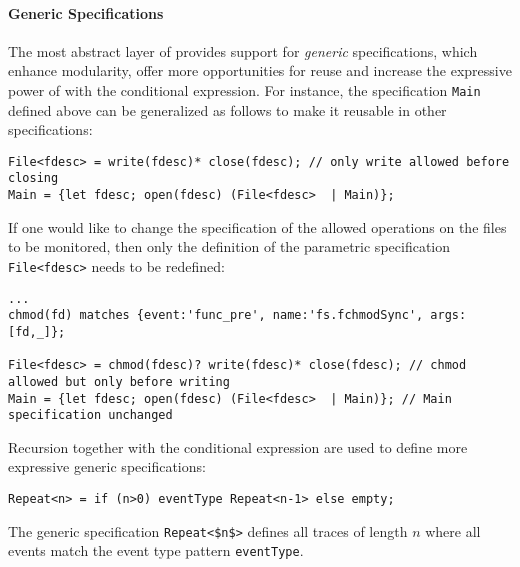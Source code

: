 \paragraph{Generic Specifications}
The most abstract layer of \rml provides support for \emph{generic} specifications,
which enhance modularity, offer more opportunities for reuse and increase the expressive power of \rml with the conditional expression.
For instance, the specification \lstinline{Main} defined above
can be generalized as follows to make it reusable in other specifications:
\begin{lstlisting}[basicstyle=\ttfamily\footnotesize]
File<fdesc> = write(fdesc)* close(fdesc); // only write allowed before closing 
Main = {let fdesc; open(fdesc) (File<fdesc>  | Main)};
\end{lstlisting}
If one would like to change the specification of the allowed operations on the files to be monitored, then only the definition
of the parametric specification \lstinline{File<fdesc>} needs to be redefined:
\begin{lstlisting}[basicstyle=\ttfamily\footnotesize]
...
chmod(fd) matches {event:'func_pre', name:'fs.fchmodSync', args:[fd,_]};

File<fdesc> = chmod(fdesc)? write(fdesc)* close(fdesc); // chmod allowed but only before writing
Main = {let fdesc; open(fdesc) (File<fdesc>  | Main)}; // Main specification unchanged
\end{lstlisting}
Recursion together with the conditional expression are used to define more expressive generic specifications:
\begin{lstlisting}[basicstyle=\ttfamily\footnotesize]
Repeat<n> = if (n>0) eventType Repeat<n-1> else empty;
\end{lstlisting}
The generic specification \lstinline{Repeat<$n$>} defines all traces of length $n$ where all events match
the event type pattern \lstinline{eventType}.

